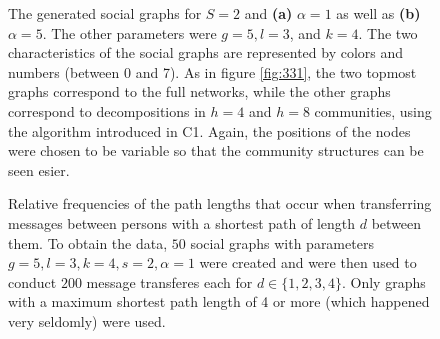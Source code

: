 \documentclass{scrartcl}
\begin{document}
\begin{figure}
    \centering
    \def\svgwidth{0.9\textwidth}
    
    \caption{The generated social graphs for $S=2$ and \textbf{(a)} $\alpha
    = 1$ as well as \textbf{(b)} $\alpha = 5$. The other parameters were 
    $g = 5, l = 3$, and $k = 4$. The two characteristics of
    the social graphs are represented by colors and numbers (between 0 and
    7).  As in figure \ref{fig:331}, the two topmost graphs correspond to
    the full networks, while the other graphs correspond to decompositions
    in $h = 4$ and $h = 8$ communities, using the algorithm introduced in C1.
    Again, the positions of the nodes were chosen to be variable so that
    the community structures can be seen esier.}
    \label{fig:332}
\end{figure}


\begin{figure}[bcht]
    \centering
    \caption{Relative frequencies of the path lengths that occur when
        transferring messages between persons with a shortest path of
        length $d$ between them. To obtain the data, $50$ social graphs
        with parameters $g = 5, l = 3, k = 4, s = 2, \alpha = 1$ were
        created and were then used to conduct $200$ message transferes each
        for $d\in\{1, 2, 3, 4\}$.  Only graphs with a maximum shortest path
        length of 4 or more (which happened very seldomly) were used. }
    \label{fig:333}
\end{figure}
\end{document}

